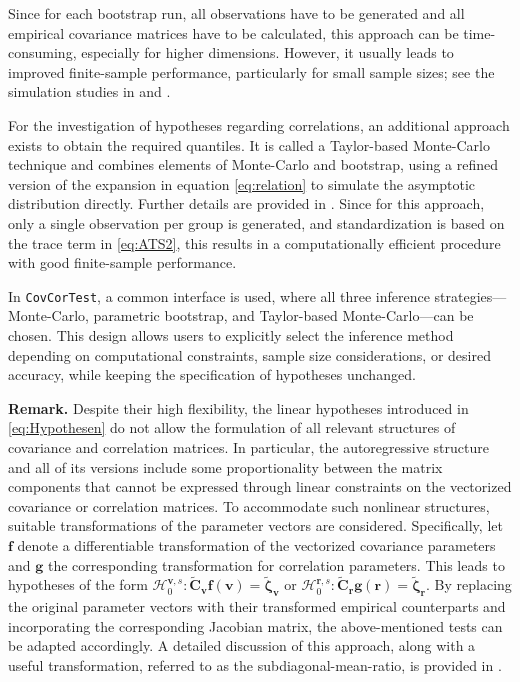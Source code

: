 Since for each bootstrap run, all observations have to be generated and all
empirical covariance matrices have to be calculated, this approach can be
time-consuming, especially for higher dimensions. However, it usually leads to
improved finite-sample performance, particularly for small sample sizes; see
the simulation studies in \citet{sattler2022} and \citet{sattler2023}.

For the investigation of hypotheses regarding correlations, an additional
approach exists to obtain the required quantiles. It is called a Taylor-based
Monte-Carlo technique and combines elements of Monte-Carlo and bootstrap, using
a refined version of the expansion in equation \eqref{eq:relation} to simulate the
asymptotic distribution directly. Further details are provided in
\citet{sattler2023}. Since for this approach, only a single observation per
group is generated, and standardization is based on the trace term in
\eqref{eq:ATS2}, this results in a computationally efficient procedure with good
finite-sample performance.

In \texttt{CovCorTest}, a common interface is used, where all three inference
strategies---Monte-Carlo, parametric bootstrap, and Taylor-based Monte-Carlo---can
be chosen. This design allows users to explicitly select the inference method
depending on computational constraints, sample size considerations, or desired
accuracy, while keeping the specification of hypotheses unchanged.

\textbf{Remark.}
Despite their high flexibility, the linear hypotheses introduced in
\eqref{eq:Hypothesen} do not allow the formulation of all relevant structures of
covariance and correlation matrices. In particular, the autoregressive
structure and all of its versions include some proportionality between the
matrix components that cannot be expressed through linear constraints on the
vectorized covariance or correlation matrices. To accommodate such nonlinear structures, suitable transformations of the
parameter vectors are considered. Specifically, let \(\boldsymbol{f}\) denote a
differentiable transformation of the vectorized covariance parameters and
\(\boldsymbol{g}\) the corresponding transformation for correlation parameters. This leads
to hypotheses of the form
\(\mathcal{H}_0^{\boldsymbol{v},s}
:
\widetilde{\boldsymbol{C}}_{\boldsymbol{v}} \boldsymbol{f}(\boldsymbol{v})
=
\widetilde{\boldsymbol{\zeta}}_{\boldsymbol{v}}\)
or
\(\mathcal{H}_0^{\boldsymbol{r},s}
:
\widetilde{\boldsymbol{C}}_{\boldsymbol{r}} \boldsymbol{g}(\boldsymbol{r})
=
\widetilde{\boldsymbol{\zeta}}_{\boldsymbol{r}}\). By replacing the original parameter vectors with their transformed empirical
counterparts and incorporating the corresponding Jacobian matrix, the
above-mentioned tests can be adapted accordingly. A detailed discussion of
this approach, along with a useful transformation, referred to as the
subdiagonal-mean-ratio, is provided in \citet{sattler2024a}.

